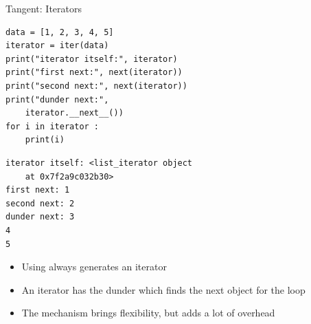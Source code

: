 \begin{frame}[fragile]{Tangent: Iterators}
%
\vspace{-4pt}
\begin{tcbraster}[raster columns=2,
                  raster equal height,
                  nobeforeafter,
                  raster column skip=0.2cm]
%
\begin{codebox}[Iterator.py]
\begin{verbatim}
data = [1, 2, 3, 4, 5]
iterator = iter(data)
print("iterator itself:", iterator)
print("first next:", next(iterator))
print("second next:", next(iterator))
print("dunder next:",
    iterator.__next__())
for i in iterator :
    print(i)
\end{verbatim}
\end{codebox}
%
\begin{cmdbox}
\begin{verbatim}
iterator itself: <list_iterator object 
    at 0x7f2a9c032b30>
first next: 1
second next: 2
dunder next: 3
4
5

\end{verbatim}
\end{cmdbox}
%
\end{tcbraster}
%
\vspace{-4pt}
\begin{hintbox}
\scriptsize
\begin{itemize}
\item Using  always generates an iterator
\item An iterator has the dunder  which finds the next object for the loop
\item The mechanism brings flexibility, but adds a lot of overhead
\end{itemize}
\end{hintbox}
%
\end{frame}


